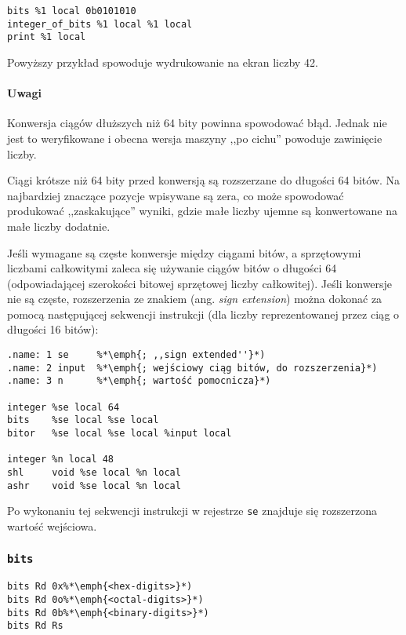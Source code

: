 \begin{lstlisting}
bits %1 local 0b0101010
integer_of_bits %1 local %1 local
print %1 local
\end{lstlisting}

Powyższy przykład spowoduje wydrukowanie na ekran liczby 42.

\paragraph*{Uwagi}

Konwersja ciągów dłuższych niż 64 bity powinna spowodować błąd. Jednak nie jest
to weryfikowane i obecna wersja maszyny ,,po cichu'' powoduje zawinięcie liczby.

Ciągi krótsze niż 64 bity przed konwersją są rozszerzane do długości 64 bitów.
Na najbardziej znaczące pozycje wpisywane są zera, co może spowodować produkować
,,zaskakujące'' wyniki, gdzie małe liczby ujemne są konwertowane na małe liczby
dodatnie.

Jeśli wymagane są częste konwersje między ciągami bitów, a sprzętowymi liczbami
całkowitymi zaleca się używanie ciągów bitów o długości 64 (odpowiadającej
szerokości bitowej sprzętowej liczby całkowitej). Jeśli konwersje nie są częste,
rozszerzenia ze znakiem (ang. \emph{sign extension}) można dokonać za pomocą
następującej sekwencji instrukcji (dla liczby reprezentowanej przez ciąg o
długości 16 bitów):
\begin{small}
\begin{lstlisting}
.name: 1 se     %*\emph{; ,,sign extended''}*)
.name: 2 input  %*\emph{; wejściowy ciąg bitów, do rozszerzenia}*)
.name: 3 n      %*\emph{; wartość pomocnicza}*)

integer %se local 64
bits    %se local %se local
bitor   %se local %se local %input local

integer %n local 48
shl     void %se local %n local
ashr    void %se local %n local
\end{lstlisting}
\end{small}
Po wykonaniu tej sekwencji instrukcji w rejestrze \texttt{se} znajduje się
rozszerzona wartość wejściowa.

\subsubsection{\texttt{bits}}

\begin{lstlisting}
bits Rd 0x%*\emph{<hex-digits>}*)
bits Rd 0o%*\emph{<octal-digits>}*)
bits Rd 0b%*\emph{<binary-digits>}*)
bits Rd Rs
\end{lstlisting}

